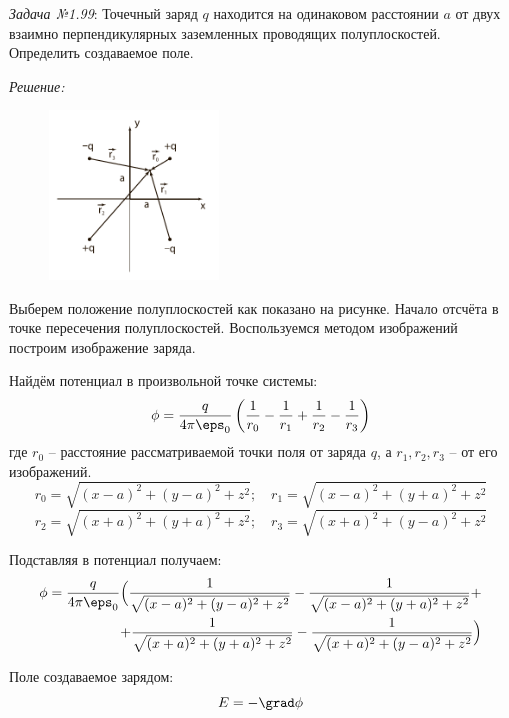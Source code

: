 \newpage

\emph{Задача №1.99}: Точечный заряд \( q \) находится на одинаковом 
расстоянии \( a \) от двух взаимно перпендикулярных заземленных проводящих 
полуплоскостей. Определить создаваемое поле.

\emph{Решение:}

\begin{figure}
	\vspace{-5ex}
	\includegraphics[width=0.4\textwidth]{pdf/image_1_99}
\end{figure}

Выберем положение полуплоскостей как показано на рисунке. Начало отсчёта 
в точке пересечения полуплоскостей. Воспользуемся методом изображений 
построим изображение заряда. 

Найдём потенциал в произвольной точке системы:
\[ 
	\phi = \frac{q}{4\pi\eps_0}\left( \frac{1}{r_0} - \frac{1}{r_1} + 
	\frac{1}{r_2} - \frac{1}{r_3} \right) 
\] 
где \( r_0 \) -- расстояние рассматриваемой точки поля от заряда \( q \), а 
\( r_1, r_2, r_3 \) -- от его изображений.
\[
	r_0 = \sqrt{(x-a)^2 + (y-a)^2 + z^2};\quad
	r_1 = \sqrt{(x-a)^2 + (y+a)^2 + z^2}
\]
\[
	r_2 = \sqrt{(x+a)^2 + (y+a)^2 + z^2};\quad
	r_3 = \sqrt{(x+a)^2 + (y-a)^2 + z^2}
\]

Подставляя в потенциал получаем:
\begin{equation*}
\begin{split}
	\phi = \frac{q}{4\pi\eps_0}\Big(
		\frac{1}{\sqrt{(x-a)^2 + (y-a)^2 + z^2}} - 
		\frac{1}{\sqrt{(x-a)^2 + (y+a)^2 + z^2}} + \\ +
		\frac{1}{\sqrt{(x+a)^2 + (y+a)^2 + z^2}} -
		\frac{1}{\sqrt{(x+a)^2 + (y-a)^2 + z^2}}
	\Big)
\end{split}
\end{equation*}

Поле создаваемое зарядом:
\[ E = -\grad\phi \]

